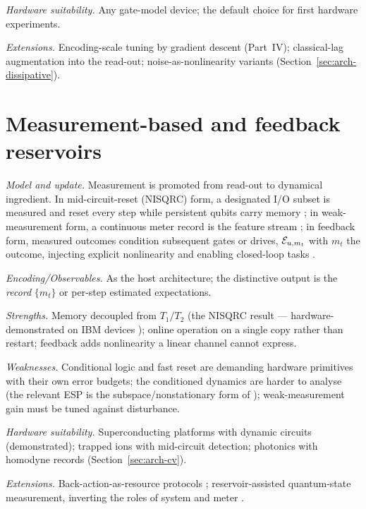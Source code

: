 \emph{Hardware suitability.} Any gate-model device; the default choice for
first hardware experiments.

\emph{Extensions.} Encoding-scale tuning by gradient descent (Part~IV);
classical-lag augmentation into the read-out; noise-as-nonlinearity variants
(Section~\ref{sec:arch-dissipative}).

\section{Measurement-based and feedback reservoirs}
\label{sec:arch-measurement}

\emph{Model and update.} Measurement is promoted from read-out to dynamical
ingredient. In mid-circuit-reset (NISQRC) form, a designated I/O subset is
measured and reset every step while persistent qubits carry memory
\citep{hu2024overcoming}; in weak-measurement form, a continuous meter record
is the feature stream \citep{mujal2023time,franceschetto2024harnessing}; in
feedback form, measured outcomes condition subsequent gates or drives,
$\mathcal{E}_{u,m_t}$ with $m_t$ the outcome, injecting explicit nonlinearity and
enabling closed-loop tasks \citep{kobayashi2024feedback}.

\emph{Encoding/Observables.} As the host architecture; the distinctive output
is the \emph{record} $\{m_t\}$ or per-step estimated expectations.

\emph{Strengths.} Memory decoupled from $T_1/T_2$ (the NISQRC result ---
hardware-demonstrated on IBM devices \citep{hu2024overcoming,yasuda2023quantum});
online operation on a single copy rather than restart; feedback adds
nonlinearity a linear channel cannot express.

\emph{Weaknesses.} Conditional logic and fast reset are demanding hardware
primitives with their own error budgets; the conditioned dynamics are harder
to analyse (the relevant ESP is the subspace/nonstationary form of
\citet{kobayashi2024extending}); weak-measurement gain must be tuned against
disturbance.

\emph{Hardware suitability.} Superconducting platforms with dynamic circuits
(demonstrated); trapped ions with mid-circuit detection; photonics with
homodyne records (Section~\ref{sec:arch-cv}).

\emph{Extensions.} Back-action-as-resource protocols
\citep{franceschetto2024harnessing}; reservoir-assisted quantum-state
measurement, inverting the roles of system and meter
\citep{angelatos2021reservoir}.

